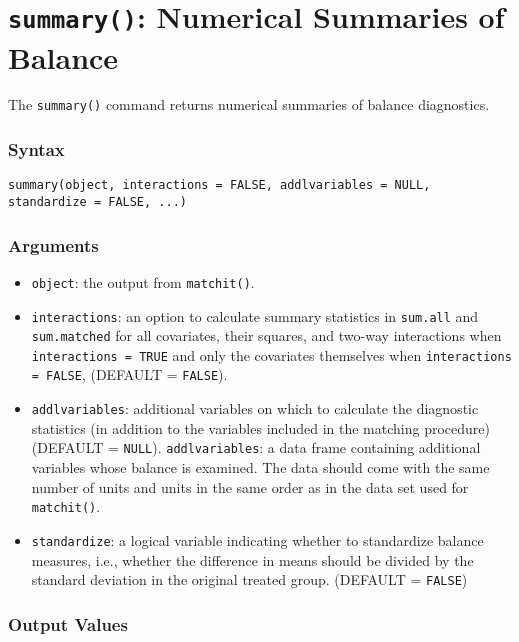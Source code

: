 \section{\texttt{summary()}: Numerical Summaries of Balance}

The \texttt{summary()} command returns numerical summaries of balance
diagnostics.

\subsubsection{Syntax}
\begin{verbatim}
summary(object, interactions = FALSE, addlvariables = NULL, standardize = FALSE, ...)
\end{verbatim}

\subsubsection{Arguments}

\begin{itemize}
\item \texttt{object}: the output from {\tt matchit()}.
\item \texttt{interactions}: an option to calculate summary statistics
  in \texttt{sum.all} and \texttt{sum.matched} for all covariates,
  their squares, and two-way interactions when \texttt{interactions =
    TRUE} and only the covariates themselves when \texttt{interactions
    = FALSE}, (DEFAULT = {\tt FALSE}).
\item \texttt{addlvariables}: additional variables on which to
  calculate the diagnostic statistics (in addition to the variables
  included in the matching procedure) (DEFAULT = {\tt NULL}).
  \texttt{addlvariables}: a data frame containing additional variables
  whose balance is examined. The data should come with the same number
  of units and units in the same order as in the data set used for
  {\tt matchit()}.
\item \texttt{standardize}: a logical variable indicating whether to
  standardize balance measures, i.e., whether the difference in means should be divided
  by the standard deviation in the original treated group. (DEFAULT = {\tt FALSE})
\end{itemize}

\subsubsection{Output Values}

